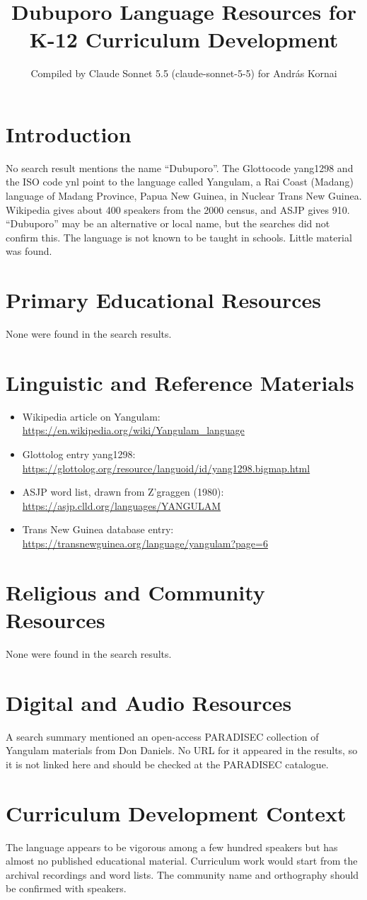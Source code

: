 \documentclass[12pt]{article}
\title{Dubuporo Language Resources for K-12 Curriculum Development}
\author{Compiled by Claude Sonnet 5.5 (claude-sonnet-5-5) for Andr\'as Kornai}
\date{}
\begin{document}
\maketitle

\section{Introduction}
No search result mentions the name ``Dubuporo''. The Glottocode yang1298 and the ISO code ynl point to the language called Yangulam, a Rai Coast (Madang) language of Madang Province, Papua New Guinea, in Nuclear Trans New Guinea. Wikipedia gives about 400 speakers from the 2000 census, and ASJP gives 910. ``Dubuporo'' may be an alternative or local name, but the searches did not confirm this. The language is not known to be taught in schools. Little material was found.

\section{Primary Educational Resources}
None were found in the search results.

\section{Linguistic and Reference Materials}
\begin{itemize}
\item Wikipedia article on Yangulam: \url{https://en.wikipedia.org/wiki/Yangulam_language}
\item Glottolog entry yang1298: \url{https://glottolog.org/resource/languoid/id/yang1298.bigmap.html}
\item ASJP word list, drawn from Z'graggen (1980): \url{https://asjp.clld.org/languages/YANGULAM}
\item Trans New Guinea database entry: \url{https://transnewguinea.org/language/yangulam?page=6}
\end{itemize}

\section{Religious and Community Resources}
None were found in the search results.

\section{Digital and Audio Resources}
A search summary mentioned an open-access PARADISEC collection of Yangulam materials from Don Daniels. No URL for it appeared in the results, so it is not linked here and should be checked at the PARADISEC catalogue.

\section{Curriculum Development Context}
The language appears to be vigorous among a few hundred speakers but has almost no published educational material. Curriculum work would start from the archival recordings and word lists. The community name and orthography should be confirmed with speakers.
\end{document}
